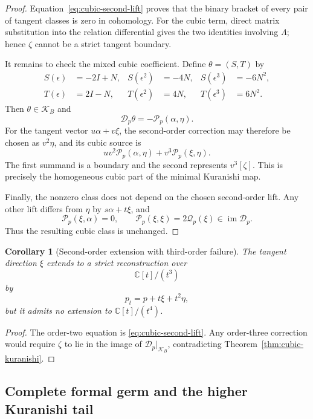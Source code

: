 \documentclass[11pt]{amsart}
\newtheorem{corollary}[theorem]{Corollary}
\newcommand{\cD}{\mathscr D}
\newcommand{\cQ}{\mathscr Q}
\newcommand{\cP}{\mathscr P}
\newcommand{\C}{\mathbb C}
\begin{document}
\begin{proof}
Equation~\eqref{eq:cubic-second-lift} proves that the binary bracket of every pair of tangent classes is zero in cohomology.  For the cubic term, direct matrix substitution into the relation differential gives the two identities involving $\Lambda$; hence $\zeta$ cannot be a strict tangent boundary.

It remains to check the mixed cubic coefficient.  Define $\theta=(S,T)$ by
\begin{align*}
S(\epsilon)&=-2I+N,
&S(\epsilon^2)&=-4N,
&S(\epsilon^3)&=-6N^2,\\
T(\epsilon)&=2I-N,
&T(\epsilon^2)&=4N,
&T(\epsilon^3)&=6N^2.
\end{align*}
Then $\theta\in\mathcal K_B$ and
\[
\cD_p\theta=-\cP_p(\alpha,\eta).
\]
For the tangent vector $u\alpha+v\xi$, the second-order correction may therefore be chosen as $v^2\eta$, and its cubic source is
\[
uv^2\cP_p(\alpha,\eta)+v^3\cP_p(\xi,\eta).
\]
The first summand is a boundary and the second represents $v^3[\zeta]$.  This is precisely the homogeneous cubic part of the minimal Kuranishi map.

Finally, the nonzero class does not depend on the chosen second-order lift.  Any other lift differs from $\eta$ by $s\alpha+t\xi$, and
\[
\cP_p(\xi,\alpha)=0,
\qquad
\cP_p(\xi,\xi)=2\cQ_p(\xi)\in\operatorname{im}\cD_p.
\]
Thus the resulting cubic class is unchanged.
\end{proof}

\begin{corollary}[Second-order extension with third-order failure]\label{cor:cubic-failure}
The tangent direction $\xi$ extends to a strict reconstruction over
\[
\C[t]/(t^3)
\]
by
\[
p_t=p+t\xi+t^2\eta,
\]
but it admits no extension to $\C[t]/(t^4)$.
\end{corollary}

\begin{proof}
The order-two equation is \eqref{eq:cubic-second-lift}.  Any order-three correction would require $\zeta$ to lie in the image of $\cD_p|_{\mathcal K_B}$, contradicting Theorem~\ref{thm:cubic-kuranishi}.
\end{proof}


\subsection{Complete formal germ and the higher Kuranishi tail}\label{subsec:cubic-complete-germ}
\end{document}
